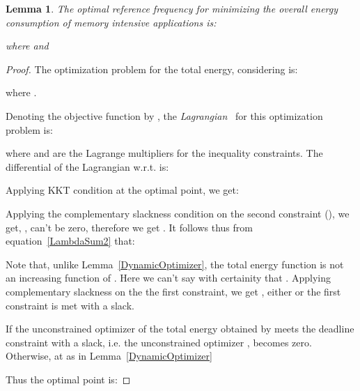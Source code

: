 \documentclass[11pt, letterpaper]{article}
\newtheorem{lemma}{Lemma}
\begin{document}
\begin{lemma}\label{TotalOptimizer}
The optimal reference frequency for minimizing the overall energy consumption of memory intensive applications  is:

where  and \\

\end{lemma}
\begin{proof}
The optimization problem for the total energy, considering  is:



where .

Denoting the objective function by , the \emph{Lagrangian}~\cite{Boyd} for this optimization problem is:


where  and  are the Lagrange multipliers for the inequality constraints.
The differential of the Lagrangian w.r.t.  is:

Applying KKT condition   at the optimal point, we get:

Applying the complementary slackness condition on the second constraint (), we get, ,  can't be zero, therefore we get  . It follows thus from equation~\ref{LambdaSum2}  that:

Note that, unlike Lemma~\ref{DynamicOptimizer}, the total energy function  is not an increasing function of .  Here we can't say with certainity that .
Applying complementary slackness on the the first constraint, we get , either  or the first constraint is met with a slack. 

If the unconstrained optimizer of the total energy obtained by  meets the deadline constraint with a slack, i.e. the unconstrained optimizer ,  becomes zero. Otherwise,  at  as in Lemma~\ref{DynamicOptimizer}

Thus the optimal point is:

\end{proof}
\end{document}
